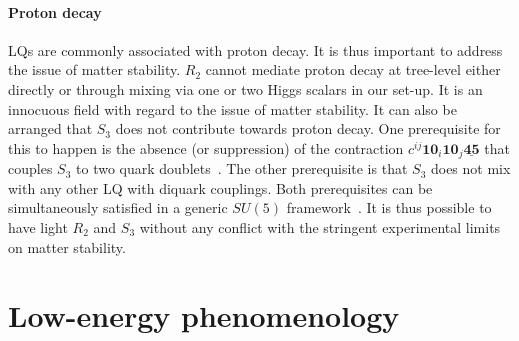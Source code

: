 \documentclass[aps,prd,superscriptaddress,twocolumn,secnumarabic]{revtex4-1}
\begin{document}
\paragraph*{Proton decay} LQs are commonly associated with proton decay. It is thus important to address the issue of matter stability. $R_2$ cannot mediate proton decay at tree-level either directly or through mixing via one or two Higgs scalars in our set-up. It is an innocuous field with regard to the issue of matter stability. It can also be arranged that $S_3$ does not contribute towards proton decay. One prerequisite for this to happen is the absence (or suppression) of the contraction $c^{ij} \bm{10}_i \bm{10}_j \underline{\bm{45}}$ that couples $S_3$ to two quark doublets~\cite{Dorsner:2012nq}. The other prerequisite is that $S_3$ does not mix with any other LQ with diquark couplings. Both prerequisites can be simultaneously satisfied in a generic $SU(5)$ framework~\cite{Dorsner:2017wwn}. It is thus possible to have light $R_2$ and $S_3$ without any conflict with the stringent experimental limits on matter stability.




\section{Low-energy phenomenology}
\end{document}
